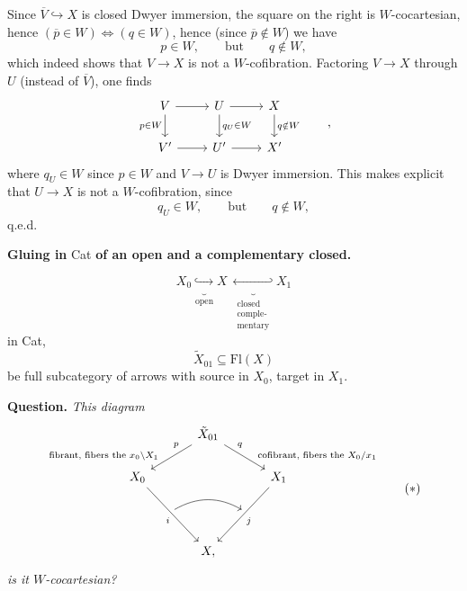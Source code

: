 \documentclass[11pt]{article}
\newcommand{\printedpage}[1]{\marginpar{\footnotesize p.~#1}}
\newcommand{\msp}[1]{\marginpar{\footnotesize [#1]}}
\begin{document}
\printedpage{12}
Since $\overline{V} \hookrightarrow X$ is closed Dwyer immersion, the square on the right is $W$-cocartesian, hence $(\overline{p} \in W) \iff (q \in W)$, hence (since $\overline{p} \notin W$) we have
\[ p \in W, \qquad \text{but} \qquad q \notin W, \]
which indeed shows that $V \longrightarrow X$ is not a $W$-cofibration. Factoring $V \longrightarrow X$ through $U$ (instead of $\overline{V}$), one finds
\[
\begin{tikzcd}
V \arrow[r] \arrow[d, "p\in W"'] & U \arrow[r] \arrow[d, "q_U\in W"] & X \arrow[d, "q\notin W"] \\
V' \arrow[r] & U' \arrow[r] & X'
\end{tikzcd}
\qquad ,
\]
where $q_U \in W$ since $p \in W$ and $V \longrightarrow U$ is Dwyer immersion. This makes explicit that $U \longrightarrow X$ is not a $W$-cofibration, since
\[ q_U \in W, \qquad \text{but} \qquad q \notin W, \]
\hfill q.e.d.

\msp{page 17}\textbf{Gluing in} Cat \textbf{of an open and a complementary closed.}


\[ X_0 \underbrace{\hookrightarrow}_{\text{open}} X \ \underbrace{\hookleftarrow}_{\substack{\text{closed}\\ \text{comple-}\\ \text{mentary}}} X_1 \]
in Cat,
\[ \tilde{X}_{01} \subseteq \mathrm{Fl}(X) \]
be full subcategory of arrows with source in $X_0$, target in $X_1$.

\textbf{Question.} \textit{This diagram}
\[
\begin{tikzcd}[column sep=small]
 & & \tilde{X}_{01} \arrow[dll, "p"' near start, "\text{fibrant, fibers the $x_0\backslash X_1$}"' near end] \arrow[drr, "q" near start, "\text{cofibrant, fibers the $X_0/x_1$}" near end] & & \\
X_0 \arrow[ddrr, "i"'] & & & & X_1 \arrow[ddll, "j"] \\
 & {} \arrow[rr, bend left] & & {} & \\
 & & X, & &
\end{tikzcd}
\tag*{$(*)$}
\]
\printedpage{13}
\textit{is it $W$-cocartesian?}
\end{document}
